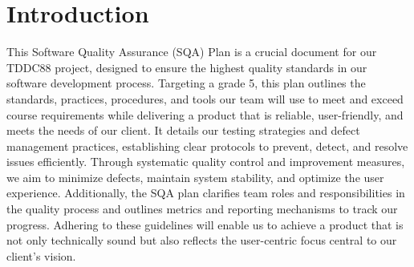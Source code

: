 \documentclass{article}
\begin{document}

\maketitle

\newpage
 
\newpage


\tableofcontents
\newpage

\section{Introduction}
This Software Quality Assurance (SQA) Plan is a crucial document for our TDDC88 project, designed to ensure the highest quality standards in our software development process. Targeting a grade 5, this plan outlines the standards, practices, procedures, and tools our team will use to meet and exceed course requirements while delivering a product that is reliable, user-friendly, and meets the needs of our client. It details our testing strategies and defect management practices, establishing clear protocols to prevent, detect, and resolve issues efficiently. Through systematic quality control and improvement measures, we aim to minimize defects, maintain system stability, and optimize the user experience. Additionally, the SQA plan clarifies team roles and responsibilities in the quality process and outlines metrics and reporting mechanisms to track our progress. Adhering to these guidelines will enable us to achieve a product that is not only technically sound but also reflects the user-centric focus central to our client’s vision.
\end{document}
